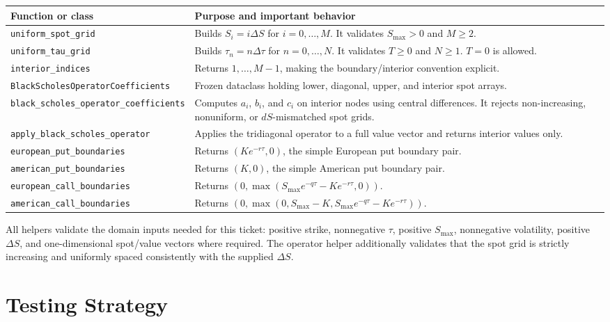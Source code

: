 \documentclass[11pt,a4paper]{article}
\newcommand{\code}[1]{\texttt{#1}}
\begin{document}
\begin{longtable}{P{0.39\textwidth}L{0.53\textwidth}}
\toprule
Function or class & Purpose and important behavior \\
\midrule
\endhead
\code{uniform\_spot\_grid} &
Builds \(S_i=i\Delta S\) for \(i=0,\ldots,M\). It validates \(S_{\max}>0\) and \(M\geq2\). \\
\code{uniform\_tau\_grid} &
Builds \(\tau_n=n\Delta\tau\) for \(n=0,\ldots,N\). It validates \(T\geq0\) and \(N\geq1\). \(T=0\) is allowed. \\
\code{interior\_indices} &
Returns \(1,\ldots,M-1\), making the boundary/interior convention explicit. \\
\code{BlackScholesOperatorCoefficients} &
Frozen dataclass holding lower, diagonal, upper, and interior spot arrays. \\
\code{black\_scholes\_operator\_coefficients} &
Computes \(a_i\), \(b_i\), and \(c_i\) on interior nodes using central differences. It rejects non-increasing, nonuniform, or \(dS\)-mismatched spot grids. \\
\code{apply\_black\_scholes\_operator} &
Applies the tridiagonal operator to a full value vector and returns interior values only. \\
\code{european\_put\_boundaries} &
Returns \((K e^{-r\tau},0)\), the simple European put boundary pair. \\
\code{american\_put\_boundaries} &
Returns \((K,0)\), the simple American put boundary pair. \\
\code{european\_call\_boundaries} &
Returns \((0,\max(S_{\max}e^{-q\tau}-Ke^{-r\tau},0))\). \\
\code{american\_call\_boundaries} &
Returns \((0,\max(0,S_{\max}-K,S_{\max}e^{-q\tau}-Ke^{-r\tau}))\). \\
\bottomrule
\end{longtable}

All helpers validate the domain inputs needed for this ticket: positive strike, nonnegative
\(\tau\), positive \(S_{\max}\), nonnegative volatility, positive \(\Delta S\), and one-dimensional
spot/value vectors where required. The operator helper additionally validates that the spot grid
is strictly increasing and uniformly spaced consistently with the supplied \(\Delta S\).

\section{Testing Strategy}
\end{document}
